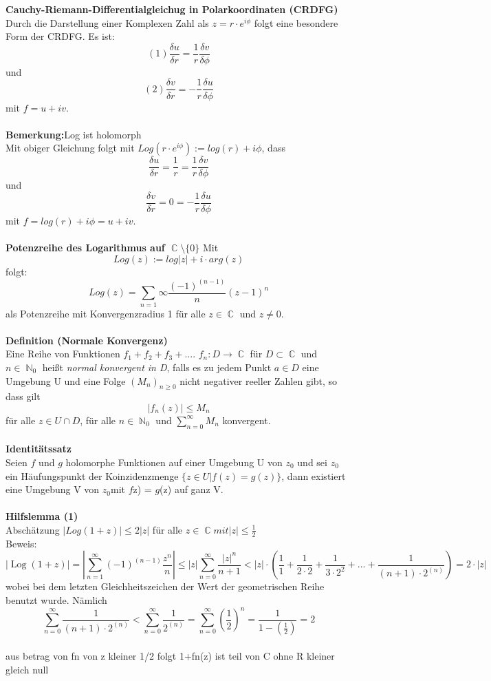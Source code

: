 \documentclass[10pt,a4paper]{article}
\DeclareMathOperator{\C}{\mathbb{C}}
\DeclareMathOperator{\N}{\mathbb{N}}
\DeclareMathOperator{\Log}{Log}
\begin{document}
\textbf{Cauchy-Riemann-Differentialgleichug in Polarkoordinaten (CRDFG)}
\\
Durch die Darstellung einer Komplexen Zahl als $z = r\cdot e^{i\phi}$ folgt eine besondere Form der CRDFG. Es ist: $$(1) \frac{\delta u}{\delta r} = \frac{1}{r} \frac{\delta v}{\delta \phi}$$ und $$(2)\frac{\delta v}{\delta r} = -\frac{1}{r} \frac{\delta u}{\delta \phi}$$ mit $f = u + iv$.
\\
\\
\textbf{Bemerkung:}Log ist holomorph
\\
Mit obiger Gleichung folgt mit $Log(r\cdot e^{i \phi}) := log(r) + i \phi$, dass $$\frac{\delta u}{\delta r} =\frac{1}{r} = \frac{1}{r} \frac{\delta v}{\delta \phi} $$ und $$\frac{\delta v}{\delta r} = 0=-\frac{1}{r} \frac{\delta u}{\delta \phi}$$ mit $f = log(r) + i\phi= u +iv$.
\\
\\
\textbf{Potenzreihe des Logarithmus auf $\C\setminus\{0\}$ }
Mit $$Log(z) := log|z|+ i \cdot arg(z)$$ folgt: $$Log(z) = \sum_{n = 1}{\infty}\frac{(-1)^{(n-1)}}{n}(z-1)^{n}$$ als Potenzreihe mit Konvergenzradius 1 für alle $z \in \C$ und $z \neq 0$.
\\
\\
\textbf{Definition (Normale Konvergenz)}
\\
Eine Reihe von Funktionen $f_{1}+f_{2}+f_{3}+....$ $f_{n}: D\rightarrow \C $ für $D \subset \C$ und $n \in \N_{0}$ heißt \textit{normal konvergent in D}, falls es zu jedem Punkt $a \in D$ eine Umgebung U und eine Folge $(M_{n})_{n\geq0}$ nicht negativer reeller Zahlen gibt, so dass gilt $$|f_{n}(z)|\leq M_{n}$$ für alle $z \in U \cap D$, für alle $n \in \N_{0}$ und $\sum_{n = 0}^{\infty}M_{n}$ konvergent.
\\
\\
\textbf{Identitätssatz}
\\
Seien $f$ und $g$ holomorphe Funktionen auf einer Umgebung U von $z_{0}$ und sei $z_{0}$ ein Häufungspunkt der Koinzidenzmenge  $\{ z \in U  |  f(z) = g(z) \}$, dann existiert eine Umgebung V von $z_{0}$mit $f$z) = $g$(z) auf ganz V.
\\
\\
\textbf{Hilfslemma (1)} 
\\
Abschätzung $ |Log(1+z)|\leq 2|z|$ für alle $z \in \C mit |z| \leq \frac{1}{2}$
\\

Beweis:
$$|\Log(1+z)|= |\sum_{n = 1}^\infty (-1)^{(n-1)}\frac{z^{n}}{n}|\leq|z|\sum_{n = 0}^\infty\frac{|z|^{n}}{n + 1} < |z|\cdot (\frac{1}{1}+\frac{1}{2\cdot 2}+\frac{1}{3 \cdot2^2}+...+\frac{1}{(n+1)\cdot2^(n)}) = 2\cdot|z| $$wobei bei dem letzten Gleichheitszeichen der Wert der geometrischen Reihe benutzt wurde. Nämlich $$\sum_{n=0}^{\infty}\frac{1}{(n+1)\cdot2^{(n)}} < \sum_{n=0}^{\infty}\frac{1}{2^{(n)}} = \sum_{n=0}^{\infty}(\frac{1}{2})^n = \frac{1}{1-(\frac{1}{2})} = 2 $$
\\ 
aus betrag von fn von z kleiner 1/2 folgt 1+fn(z) ist teil von C ohne R kleiner gleich null
\end{document}
